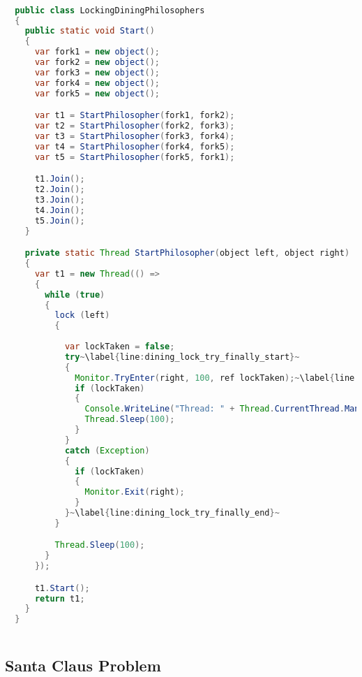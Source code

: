 \begin{lstlisting}[label=lst:impl_dining_lock,
  caption={Lock based dining philosophers Iimplementation},
  language=Java,  
  showspaces=false,
  showtabs=false,
  breaklines=true,
  showstringspaces=false,
  breakatwhitespace=true,
  commentstyle=\color{greencomments},
  keywordstyle=\color{bluekeywords},
  stringstyle=\color{redstrings},
  escapechar=~,
  morekeywords={atomic, retry, orelse, var, get, set, ref, out, readonly, virtual, override}]  % Start your code-block

  public class LockingDiningPhilosophers
  {
  	public static void Start()
  	{
      var fork1 = new object();
      var fork2 = new object();
      var fork3 = new object();
      var fork4 = new object();
      var fork5 = new object();

      var t1 = StartPhilosopher(fork1, fork2);
      var t2 = StartPhilosopher(fork2, fork3);
      var t3 = StartPhilosopher(fork3, fork4);
      var t4 = StartPhilosopher(fork4, fork5);
      var t5 = StartPhilosopher(fork5, fork1);

      t1.Join();
      t2.Join();
      t3.Join();
      t4.Join();
      t5.Join();
    }

    private static Thread StartPhilosopher(object left, object right)
    {
      var t1 = new Thread(() =>
      {
        while (true)
        {
          lock (left)
          {
          
            var lockTaken = false;
            try~\label{line:dining_lock_try_finally_start}~
            {
              Monitor.TryEnter(right, 100, ref lockTaken);~\label{line:dining_lock_try}~
              if (lockTaken)
              {
                Console.WriteLine("Thread: " + Thread.CurrentThread.ManagedThreadId + " eating.");
                Thread.Sleep(100);
              }
            }
            catch (Exception)
            {
              if (lockTaken)
              {
                Monitor.Exit(right);
              }
            }~\label{line:dining_lock_try_finally_end}~
          }

          Thread.Sleep(100);
        }
      });

      t1.Start();
      return t1;
    }
  }
  
\end{lstlisting}

\subsection{Santa Claus Problem}

